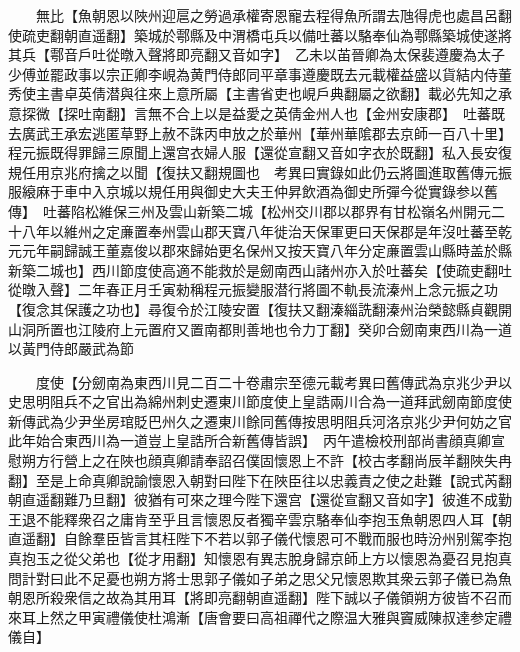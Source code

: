 　　無比【魚朝恩以陜州迎扈之勞過承權寄恩寵去程得魚所謂去虺得虎也處昌呂翻使疏吏翻朝直遥翻】築城於鄠縣及中渭橋屯兵以備吐蕃以駱奉仙為鄠縣築城使遂將其兵【鄠音戶吐從暾入聲將即亮翻又音如字】　乙未以苖晉卿為太保裴遵慶為太子少傅並罷政事以宗正卿李峴為黄門侍郎同平章事遵慶既去元載權益盛以貨結内侍董秀使主書卓英倩潜與往來上意所屬【主書省吏也峴戶典翻屬之欲翻】載必先知之承意探微【探吐南翻】言無不合上以是益愛之英倩金州人也【金州安康郡】　吐蕃既去廣武王承宏逃匿草野上赦不誅丙申放之於華州【華州華隂郡去京師一百八十里】　程元振既得罪歸三原聞上還宫衣婦人服【還從宣翻又音如字衣於既翻】私入長安復規任用京兆府擒之以聞【復扶又翻規圖也　考異曰實錄如此仍云將圖進取舊傳元振服縗麻于車中入京城以規任用與御史大夫王仲昇飲酒為御史所彈今從實錄参以舊傳】　吐蕃陷松維保三州及雲山新築二城【松州交川郡以郡界有甘松嶺名州開元二十八年以維州之定亷置奉州雲山郡天寶八年徙治天保軍更曰天保郡是年沒吐蕃至乾元元年嗣歸誠王董嘉俊以郡來歸始更名保州又按天寶八年分定亷置雲山縣時盖於縣新築二城也】西川節度使高適不能救於是劒南西山諸州亦入於吐蕃矣【使疏吏翻吐從暾入聲】二年春正月壬寅勑稱程元振變服潜行將圖不軌長流溱州上念元振之功【復念其保護之功也】尋復令於江陵安置【復扶又翻溱緇詵翻溱州治榮懿縣貞觀開山洞所置也江陵府上元置府又置南都則善地也令力丁翻】癸卯合劒南東西川為一道以黃門侍郎嚴武為節

　　度使【分劒南為東西川見二百二十卷肅宗至德元載考異曰舊傳武為京兆少尹以史思明阻兵不之官出為綿州刺史遷東川節度使上皇誥兩川合為一道拜武劒南節度使新傳武為少尹坐房琯貶巴州久之遷東川餘同舊傳按思明阻兵河洛京兆少尹何妨之官此年始合東西川為一道豈上皇誥所合新舊傳皆誤】　丙午遣檢校刑部尚書顔真卿宣慰朔方行營上之在陜也顔真卿請奉詔召僕固懷恩上不許【校古孝翻尚辰羊翻陜失冉翻】至是上命真卿說諭懷恩入朝對曰陛下在陜臣往以忠義責之使之赴難【說式芮翻朝直遥翻難乃旦翻】彼猶有可來之理今陛下還宫【還從宣翻又音如字】彼進不成勤王退不能釋衆召之庸肯至乎且言懷恩反者獨辛雲京駱奉仙李抱玉魚朝恩四人耳【朝直遥翻】自餘羣臣皆言其枉陛下不若以郭子儀代懷恩可不戰而服也時汾州别駕李抱真抱玉之從父弟也【從才用翻】知懷恩有異志脫身歸京師上方以懷恩為憂召見抱真問計對曰此不足憂也朔方將士思郭子儀如子弟之思父兄懷恩欺其衆云郭子儀已為魚朝恩所殺衆信之故為其用耳【將即亮翻朝直遥翻】陛下誠以子儀領朔方彼皆不召而來耳上然之甲寅禮儀使杜鴻漸【唐會要曰高祖禪代之際温大雅與竇威陳叔達参定禮儀自】

